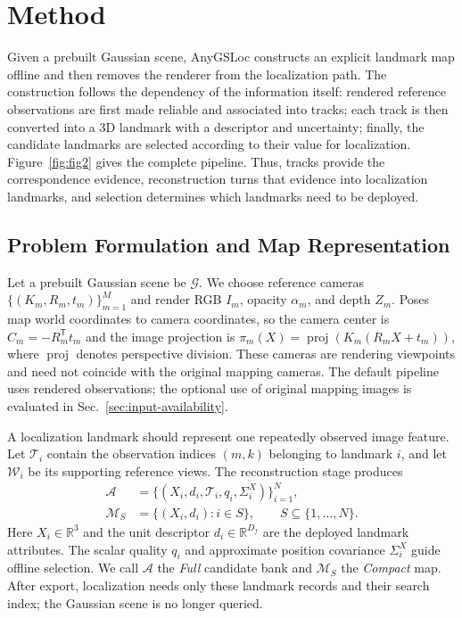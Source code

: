 \section{Method}
\label{sec:method}


Given a prebuilt Gaussian scene, AnyGSLoc constructs an explicit landmark map offline and then removes the renderer from the localization path. The construction follows the dependency of the information itself: rendered reference observations are first made reliable and associated into tracks; each track is then converted into a 3D landmark with a descriptor and uncertainty; finally, the candidate landmarks are selected according to their value for localization. Figure~\ref{fig:fig2} gives the complete pipeline. Thus, tracks provide the correspondence evidence, reconstruction turns that evidence into localization landmarks, and selection determines which landmarks need to be deployed.

\subsection{Problem Formulation and Map Representation}
\label{sec:overview}

Let a prebuilt Gaussian scene be $\mathcal G$. We choose reference cameras $\{(K_m,R_m,t_m)\}_{m=1}^{M}$ and render RGB $I_m$, opacity $\alpha_m$, and depth $Z_m$. Poses map world coordinates to camera coordinates, so the camera center is $C_m=-R_m^\mathsf Tt_m$ and the image projection is $\pi_m(X)=\operatorname{proj}(K_m(R_mX+t_m))$, where $\operatorname{proj}$ denotes perspective division. These cameras are rendering viewpoints and need not coincide with the original mapping cameras. The default pipeline uses rendered observations; the optional use of original mapping images is evaluated in Sec.~\ref{sec:input-availability}.

A localization landmark should represent one repeatedly observed image feature. Let $\mathcal T_i$ contain the observation indices $(m,k)$ belonging to landmark $i$, and let $\mathcal W_i$ be its supporting reference views. The reconstruction stage produces
\begin{equation}
\begin{aligned}
\mathcal A&=\{(X_i,d_i,\mathcal T_i,q_i,\Sigma_i^X)\}_{i=1}^{N},\\
\mathcal M_S&=\{(X_i,d_i):i\in S\},\qquad S\subseteq\{1,\ldots,N\}.
\end{aligned}
\label{eq:landmark}
\end{equation}
Here $X_i\in\mathbb R^3$ and the unit descriptor $d_i\in\mathbb R^{D_f}$ are the deployed landmark attributes. The scalar quality $q_i$ and approximate position covariance $\Sigma_i^X$ guide offline selection. We call $\mathcal A$ the \emph{Full} candidate bank and $\mathcal M_S$ the \emph{Compact} map. After export, localization needs only these landmark records and their search index; the Gaussian scene is no longer queried.

